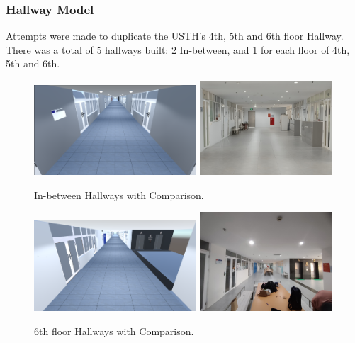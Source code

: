 \documentclass[12pt]{article}
\begin{document}
\clearpage
\subsubsection{Hallway Model}
Attempts were made to duplicate the USTH's 4th, 5th and 6th floor Hallway. There was a total of 5 hallways built: 2 In-between, and 1 for each floor of 4th, 5th and 6th.
\begin{figure}[H]
    \centering
    \includegraphics[width=0.54\textwidth]{f3.png}
    \includegraphics[width=0.44\textwidth]{hallway.png}
    \caption{In-between Hallways with Comparison.}
\end{figure}
\begin{figure}[H]
    \centering
    \includegraphics[width=0.54\textwidth]{f1.png}
    \includegraphics[width=0.44\textwidth]{t6.jpg}
    \caption{6th floor Hallways with Comparison.}
\end{figure}
\end{document}
